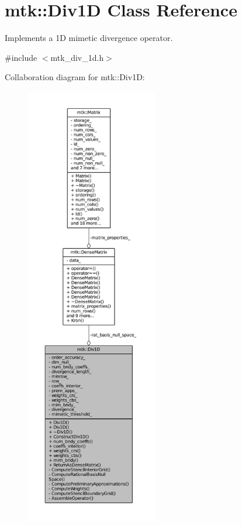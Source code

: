 \hypertarget{classmtk_1_1Div1D}{\section{mtk\+:\+:Div1\+D Class Reference}
\label{classmtk_1_1Div1D}
}


Implements a 1\+D mimetic divergence operator.  




{\ttfamily \#include $<$mtk\+\_\+div\+\_\+1d.\+h$>$}



Collaboration diagram for mtk\+:\+:Div1\+D\+:\nopagebreak
\begin{figure}[H]
\begin{center}
\leavevmode
\includegraphics[height=550pt]{classmtk_1_1Div1D__coll__graph}
\end{center}
\end{figure}
